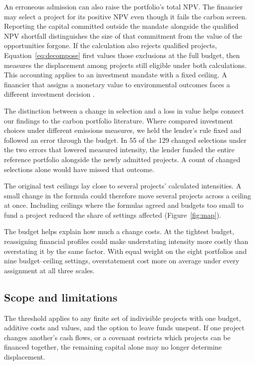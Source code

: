 \documentclass[ijfs,article,submit,oneauthor]{Definitions/mdpi}
\begin{document}
An erroneous admission can also raise the portfolio's total NPV. The financier may select a project for its positive NPV even though it fails the carbon screen. Reporting the capital committed outside the mandate alongside the qualified NPV shortfall distinguishes the size of that commitment from the value of the opportunities forgone. If the calculation also rejects qualified projects, Equation~\eqref{eq:decompose} first values those exclusions at the full budget, then measures the displacement among projects still eligible under both calculations. This accounting applies to an investment mandate with a fixed ceiling. A financier that assigns a monetary value to environmental outcomes faces a different investment decision \citep{schoenmaker}.

The distinction between a change in selection and a loss in value helps connect our findings to the carbon portfolio literature. Where \citet{anquetin} compared investment choices under different emissions measures, we held the lender's rule fixed and followed an error through the budget. In 55 of the 129 changed selections under the two errors that lowered measured intensity, the lender funded the entire reference portfolio alongside the newly admitted projects. A count of changed selections alone would have missed that outcome.

The original test ceilings lay close to several projects' calculated intensities. A small change in the formula could therefore move several projects across a ceiling at once. Including ceilings where the formulas agreed and budgets too small to fund a project reduced the share of settings affected (Figure~\ref{fig:map}).

The budget helps explain how much a change costs. At the tightest budget, reassigning financial profiles could make understating intensity more costly than overstating it by the same factor. With equal weight on the eight portfolios and nine budget--ceiling settings, overstatement cost more on average under every assignment at all three scales.

\subsection{Scope and limitations}
The threshold applies to any finite set of indivisible projects with one budget, additive costs and values, and the option to leave funds unspent. If one project changes another's cash flows, or a covenant restricts which projects can be financed together, the remaining capital alone may no longer determine displacement.
\end{document}
